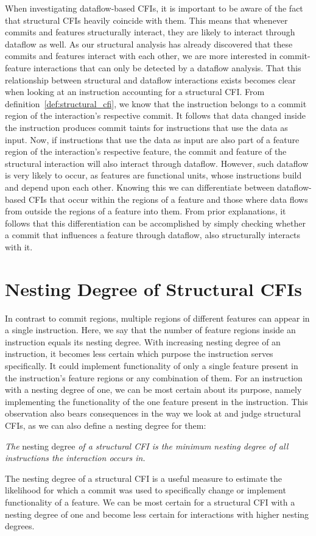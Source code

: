 When investigating dataflow-based CFIs, it is important to be aware of the fact that structural CFIs heavily coincide with them.
This means that whenever commits and features structurally interact, they are likely to interact through dataflow as well.
As our structural analysis has already discovered that these commits and features interact with each other, 
we are more interested in commit-feature interactions that can only be detected by a dataflow analysis.
That this relationship between structural and dataflow interactions exists becomes clear when looking at an instruction accounting for a structural CFI.
From definition~\ref{def:structural_cfi}, we know that the instruction belongs to a commit region of the interaction's respective commit.
It follows that data changed inside the instruction produces commit taints for instructions that use the data as input. 
Now, if instructions that use the data as input are also part of a feature region of the interaction's respective feature, the commit and feature of the structural interaction will also interact through dataflow.
However, such dataflow is very likely to occur, as features are functional units, whose instructions build and depend upon each other. 
Knowing this we can differentiate between dataflow-based CFIs that occur within the regions of a feature and those where data flows from outside the regions of a feature into them.
From prior explanations, it follows that this differentiation can be accomplished by simply checking whether a commit that influences a feature through dataflow, also structurally interacts with it. 

\section{Nesting Degree of Structural CFIs}\label{sec:nesting_degree}

In contrast to commit regions, multiple regions of different features can appear in a single instruction.
Here, we say that the number of feature regions inside an instruction equals its nesting degree.
With increasing nesting degree of an instruction, it becomes less certain which purpose the instruction serves specifically.
It could implement functionality of only a single feature present in the instruction's feature regions or any combination of them.
For an instruction with a nesting degree of one, we can be most certain about its purpose, namely implementing the functionality of the one feature present in the instruction.
This observation also bears consequences in the way we look at and judge structural CFIs, as we can also define a nesting degree for them:
\begin{definition} \label{def:nesting_degree}
\emph{The} nesting degree \emph{of a structural CFI is the minimum nesting degree of all instructions the interaction occurs in.}
\end{definition}
The nesting degree of a structural CFI is a useful measure to estimate the likelihood for which a commit was used to specifically change or implement functionality of a feature.
We can be most certain for a structural CFI with a nesting degree of one and become less certain for interactions with higher nesting degrees. \\


